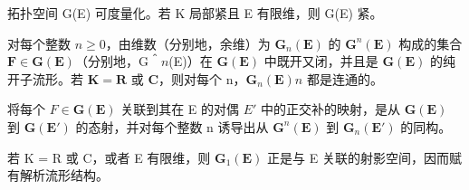 拓扑空间 G(E) 可度量化。若 K 局部紧且 E 有限维，则 G(E) 紧。

对每个整数 \(n \geqslant 0\)，由维数（分别地，余维）为 \(\mathbf{G}_{n}(\mathbf{E})\) 的 \(\mathbf{G}^{n}(\mathbf{E})\) 构成的集合 \(\mathbf{F} \in \mathbf{G}(\mathbf{E})\)（分别地，G＾\(n\)(E)）在 \(\mathbf{G}(\mathbf{E})\) 中既开又闭，并且是 \(\mathbf{G}(\mathbf{E})\) 的纯开子流形。若 \(\mathbf{K} = \mathbf{R}\) 或 \(\mathbf{C}\)，则对每个 n，\(\mathbf{G}_{n}(\mathbf{E})\)\(n\) 都是连通的。

将每个 \(F \in \mathbf{G}(\mathbf{E})\) 关联到其在 E 的对偶 \(E'\) 中的正交补的映射，是从 \(\mathbf{G}(\mathbf{E})\) 到 \(\mathbf{G}(\mathbf{E}')\) 的态射，并对每个整数 n 诱导出从 \(\mathbf{G}^{n}(\mathbf{E})\) 到 \(\mathbf{G}_{n}(\mathbf{E}')\) 的同构。

若 K = R 或 C，或者 E 有限维，则 \(\mathbf{G}_{1}(\mathbf{E})\) 正是与 E 关联的射影空间，因而赋有解析流形结构。

